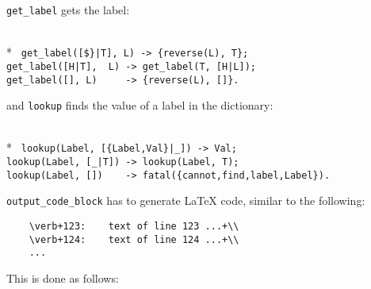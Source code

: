 \verb+get_label+ gets the label:

\begin{flushleft}
\label{eweave_6_14}
\\*
\tt
\noindent{}%
\verb&get_label([$}|T], L) -> {reverse(L), T};&\\
\noindent{}%
\verb&get_label([H|T],  L) -> get_label(T, [H|L]);&\\
\noindent{}%
\verb&get_label([], L)     -> {reverse(L), []}.&\\
\end{flushleft}

and \verb+lookup+ finds the value of a label in the dictionary:

\begin{flushleft}
\label{eweave_7_14}
\\*
\tt
\noindent{}%
\verb&lookup(Label, [{Label,Val}|_]) -> Val;&\\
\noindent{}%
\verb&lookup(Label, [_|T]) -> lookup(Label, T);&\\
\noindent{}%
\verb&lookup(Label, [])    -> fatal({cannot,find,label,Label}).&\\
\end{flushleft}

\verb+output_code_block+ has to generate \LaTeX{} code, similar to the
following:
\begin{verbatim}
    \verb+123:    text of line 123 ...+\\
    \verb+124:    text of line 124 ...+\\
    ...
\end{verbatim}

This is done as follows:

